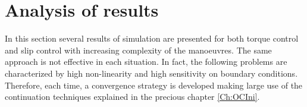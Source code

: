 \chapter{Analysis of results}
\label{Ch:Results}
In this section several results of simulation are presented for both torque control and slip control with increasing complexity of the manoeuvres. The same approach is not effective in each situation. In fact, the following problems are characterized by high non-linearity and high sensitivity on boundary conditions. Therefore, each time, a convergence strategy is developed making large use of the continuation techniques explained in the precious chapter \ref{Ch:OCIni}.    
%






%

